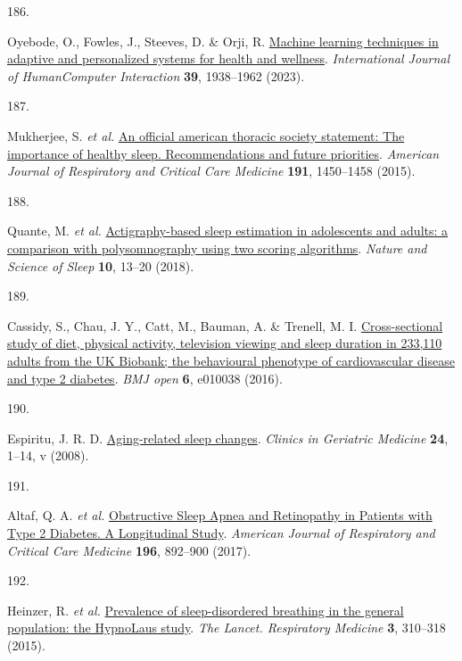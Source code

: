 \documentclass[
  10pt,
]{scrbook}
\newlength{\cslhangindent}
\newlength{\csllabelwidth}
\newlength{\cslentryspacingunit} %
\newenvironment{CSLReferences}[2] %
 {%
  \setlength{\parindent}{0pt}
  \ifodd #1
  \let\oldpar\par
  \def\par{\hangindent=\cslhangindent\oldpar}
  \fi
  \setlength{\parskip}{#2\cslentryspacingunit}
 }%
 {}
\newcommand{\CSLLeftMargin}[1]{\parbox[t]{\csllabelwidth}{#1}}
\newcommand{\CSLRightInline}[1]{\parbox[t]{\linewidth - \csllabelwidth}{#1}\break}
\let\originaltextbf\textbf
\renewcommand{\textbf}[1]{\textcolor{color1}{\textsf{\originaltextbf{#1}}}}
\begin{document}
\begin{CSLReferences}{0}{0}
\leavevmode{}%
\CSLLeftMargin{186. }%
\CSLRightInline{Oyebode, O., Fowles, J., Steeves, D. \& Orji, R.
\href{https://doi.org/10.1080/10447318.2022.2089085}{Machine learning
techniques in adaptive and personalized systems for health and
wellness}. \emph{International Journal of Human{\textendash}Computer
Interaction} \textbf{39}, 1938--1962 (2023).}

\leavevmode{}%
\CSLLeftMargin{187. }%
\CSLRightInline{Mukherjee, S. \emph{et al.}
\href{https://doi.org/10.1164/rccm.201504-0767ST}{An official american
thoracic society statement: The importance of healthy sleep.
Recommendations and future priorities}. \emph{American Journal of
Respiratory and Critical Care Medicine} \textbf{191}, 1450--1458
(2015).}

\leavevmode{}%
\CSLLeftMargin{188. }%
\CSLRightInline{Quante, M. \emph{et al.}
\href{https://doi.org/10.2147/NSS.S151085}{Actigraphy-based sleep
estimation in adolescents and adults: a comparison with polysomnography
using two scoring algorithms}. \emph{Nature and Science of Sleep}
\textbf{10}, 13--20 (2018).}

\leavevmode{}%
\CSLLeftMargin{189. }%
\CSLRightInline{Cassidy, S., Chau, J. Y., Catt, M., Bauman, A. \&
Trenell, M. I.
\href{https://doi.org/10.1136/bmjopen-2015-010038}{Cross-sectional study
of diet, physical activity, television viewing and sleep duration in
233,110 adults from the UK Biobank; the behavioural phenotype of
cardiovascular disease and type 2 diabetes}. \emph{BMJ open} \textbf{6},
e010038 (2016).}

\leavevmode{}%
\CSLLeftMargin{190. }%
\CSLRightInline{Espiritu, J. R. D.
\href{https://doi.org/10.1016/j.cger.2007.08.007}{Aging-related sleep
changes}. \emph{Clinics in Geriatric Medicine} \textbf{24}, 1--14, v
(2008).}

\leavevmode{}%
\CSLLeftMargin{191. }%
\CSLRightInline{Altaf, Q. A. \emph{et al.}
\href{https://doi.org/10.1164/rccm.201701-0175OC}{Obstructive Sleep
Apnea and Retinopathy in Patients with Type 2 Diabetes. A Longitudinal
Study}. \emph{American Journal of Respiratory and Critical Care
Medicine} \textbf{196}, 892--900 (2017).}

\leavevmode{}%
\CSLLeftMargin{192. }%
\CSLRightInline{Heinzer, R. \emph{et al.}
\href{https://doi.org/10.1016/S2213-2600(15)00043-0}{Prevalence of
sleep-disordered breathing in the general population: the HypnoLaus
study}. \emph{The Lancet. Respiratory Medicine} \textbf{3}, 310--318
(2015).}


\end{CSLReferences}
\end{document}
